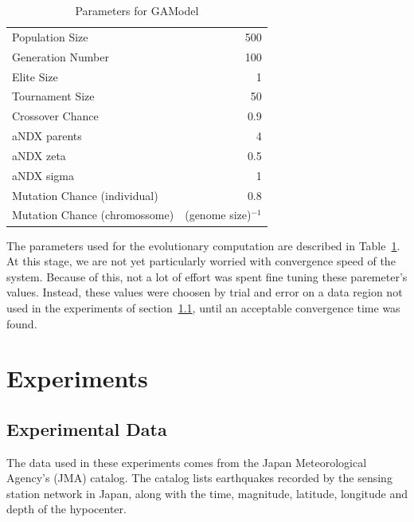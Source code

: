 \documentclass{sig-alternate}
\begin{document}
\begin{table}[!h]
  \begin{center}
  \begin{tabular}{|l|r|}
    \hline
    Population Size & 500\\
    Generation Number & 100\\
    Elite Size & 1\\
    Tournament Size & 50\\
    Crossover Chance & 0.9\\
    aNDX parents & 4\\
    aNDX zeta & 0.5\\
    aNDX sigma & 1\\
    Mutation Chance (individual) & 0.8\\
    Mutation Chance (chromossome) & (genome size)$^{-1}$\\
    \hline    
  \end{tabular}
  \end{center}
  \caption{Parameters for GAModel}
  \label{GAParameters}
\end{table}

The parameters used for the evolutionary computation are described in
Table~\ref{GAParameters}. At this stage, we are not yet particularly
worried with convergence speed of the system. Because of this, not a
lot of effort was spent fine tuning these paremeter's values. Instead,
these values were choosen by trial and error on a data region not used
in the experiments of section~\ref{data}, until an acceptable
convergence time was found.


\section{Experiments}

\subsection{Experimental Data}\label{data}

The data used in these experiments comes from the Japan Meteorological
Agency's (JMA) catalog. The catalog lists earthquakes recorded by the
sensing station network in Japan, along with the time, magnitude,
latitude, longitude and depth of the hypocenter.
\end{document}
